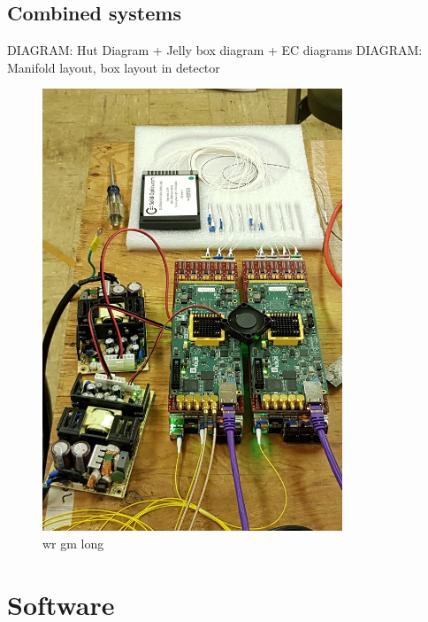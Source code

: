 \subsection{Combined systems} %
\label{sec:daq_hard_combined} %

DIAGRAM: Hut Diagram + Jelly box diagram + EC diagrams
DIAGRAM: Manifold layout, box layout in detector

\begin{figure} %
    \includegraphics[width=0.8\textwidth]{diagrams/6-daq/wr_gm.jpg}
    \caption[wr gm short]
    {wr gm long}
    \label{fig:wr_gm}
\end{figure}

\section{Software} %
\label{sec:daq_soft} %

